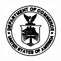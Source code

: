 \documentclass[
]{article}
\author{}
\date{\vspace{-2.5em}}
\begin{document}
\begin{flushleft}\includegraphics[width=1\linewidth]{dmaletter} \end{flushleft}
\end{document}

